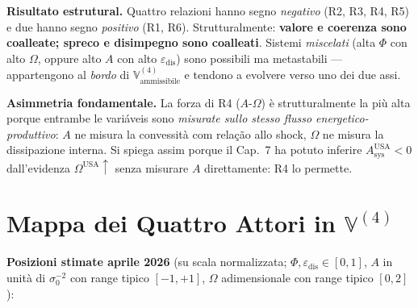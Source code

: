 \Proved{} \textbf{Risultato estrutural.} Quattro relazioni hanno segno
\emph{negativo} (R2, R3, R4, R5) e due hanno segno \emph{positivo} (R1,
R6). Strutturalmente: \textbf{valore e coerenza sono coalleate; spreco e
disimpegno sono coalleati}. Sistemi \emph{miscelati} (alta \(\Phi\) con
alto \(\Omega\), oppure alto \(A\) con alto
\(\varepsilon_{\text{dis}}\)) sono possibili ma metastabili ---
appartengono al \emph{bordo} di
\(\mathbb{V}^{(4)}_{\text{ammissibile}}\) e tendono a evolvere verso uno
dei due assi.

\Hypoth{} \textbf{Asimmetria fondamentale.} La forza di R4
(\(A\)-\(\Omega\)) è strutturalmente la più alta porque entrambe le
variáveis sono \emph{misurate sullo stesso flusso
energetico-produttivo}: \(A\) ne misura la convessità com relação allo
shock, \(\Omega\) ne misura la dissipazione interna. Si spiega assim
porque il Cap.~7 ha potuto inferire \(A_{\text{sys}}^{\text{USA}} < 0\)
dall'evidenza \(\Omega^{\text{USA}} \uparrow\) senza misurare \(A\)
direttamente: R4 lo permette.



\section{\texorpdfstring{Mappa dei Quattro Attori in
\(\mathbb{V}^{(4)}\)}{Mappa dei Quattro Attori in \textbackslash mathbb\{V\}\^{}\{(4)\}}}\label{mappa-dei-quattro-attori-in-mathbbv4}

\Proved{} \textbf{Posizioni stimate aprile 2026} (su scala normalizzata;
\(\Phi, \varepsilon_{\text{dis}} \in [0,1]\), \(A\) in unità di
\(\sigma_0^{-2}\) con range tipico \([-1, +1]\), \(\Omega\)
adimensionale con range tipico \([0, 2]\)):

